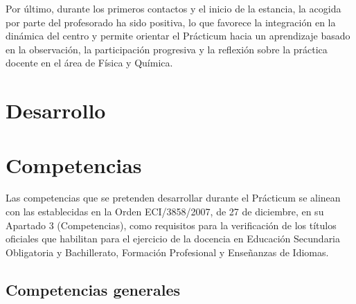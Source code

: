 \documentclass[12pt,a4paper]{article}
\begin{document}
Por último, durante los primeros contactos y el inicio de la estancia, la acogida por parte del profesorado ha sido positiva, lo que favorece la integración en la dinámica del centro y permite orientar el Prácticum hacia un aprendizaje basado en la observación, la participación progresiva y la reflexión sobre la práctica docente en el área de Física y Química.

\section{Desarrollo}\label{sec:desarrollo}

\section{Competencias}\label{subsec:competencias}

Las competencias que se pretenden desarrollar durante el Prácticum se alinean con las establecidas en la Orden ECI/3858/2007, de 27 de diciembre, en su Apartado 3 (Competencias), como requisitos para la verificación de los títulos oficiales que habilitan para el ejercicio de la docencia en Educación Secundaria Obligatoria y Bachillerato, Formación Profesional y Enseñanzas de Idiomas.

\subsection{Competencias generales}\label{subsec:competencias_generales}
\end{document}
